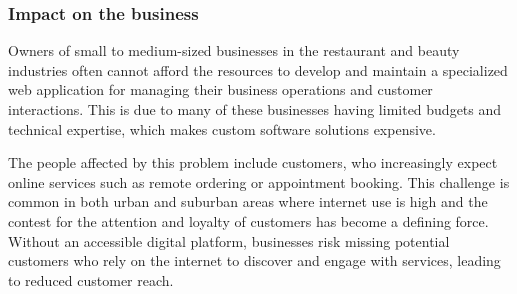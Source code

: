 \documentclass[]{VUMIFTemplateClass}
\begin{document}





\subsubsection{Impact on the business}

Owners of small to medium-sized businesses in the restaurant and beauty
industries often cannot afford the resources to develop and maintain a
specialized web application for managing their business operations and customer
interactions. This is due to many of these businesses having limited budgets and
technical expertise, which makes custom software solutions expensive.

The people affected by this problem include customers, who increasingly expect
online services such as remote ordering or appointment booking. This challenge
is common in both urban and suburban areas where internet use is high and the
contest for the attention and loyalty of customers has become a defining force.
Without an accessible digital platform, businesses risk missing potential
customers who rely on the internet to discover and engage with services,
leading to reduced customer reach. 
\end{document}
